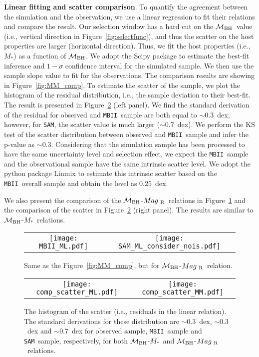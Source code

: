 \documentclass{natureprintstyle}
\newcommand{\mbh}{$\mathcal M_{\rm BH}$}
\newcommand{\mr}{$Mag_{\rm ~R}$}
\newcommand{\mstar}{{$M_*$}}
\newcommand{\sam}{\texttt{SAM}}
\newcommand{\mbii}{\texttt{MBII}}
\begin{document}
\textbf{Linear fitting and scatter comparison}.  
To quantify the agreement between the simulation and the observation, we use a linear regression to fit their relations and compare the result. Our selection window has a hard cut on the \mbh\ value (i.e., vertical direction in Figure~\ref{fig:selectfunc}), and thus the scatter on the host properties are larger (horizontal direction). Thus, we fit the host properties (i.e., \mstar) as a function of \mbh. We adopt the {\sc Scipy} package to estimate the best-fit inference and $1-\sigma$ confidence interval for the simulated sample. We then use the sample slope value to fit for the observations. The comparison results are showing in Figure~\ref{fig:MM_comp}. To estimate the scatter of the sample, we plot the histogram of the residual distribution, i.e., the sample deviation to their best-fit. The result is presented in Figure~\ref{fig:offset_comp} (left panel). We find the standard derivation of the residual for observed and \mbii\ sample are both equal to $\sim0.3$~dex; however, for \sam, the scatter value is much larger ($\sim0.7$~dex).  We perform the KS test of the scatter distribution between observed and \mbii\ sample and infer the p-value as $\sim0.3$. Considering that the simulation sample has been processed to have the same uncertainty level and selection effect, we expect the \mbii\ sample and the observational sample have the same intrinsic scatter level. We adopt the python package {\sc Linmix} to estimate this intrinsic scatter based on the \mbii\ overall sample and obtain the level as $0.25$~dex.

We also present the comparison of the \mbh-\mr\ relations in Figure~\ref{fig:ML_comp} and the comparison of the scatter in Figure~\ref{fig:offset_comp} (right panel). The results are similar to \mbh-\mstar\ relations.

\begin{figure*}[t]%
\begin{tabular}{c c}
\texttt{[image: MBII\_ML.pdf]} &
\texttt{[image: SAM\_ML\_consider\_nois.pdf]} \\
\end{tabular}
\caption{Same as the Figure~\ref{fig:MM_comp}, but for \mbh-\mr\ relation.}
\label{fig:ML_comp}
\end{figure*}


\begin{figure*}[t]%
\begin{tabular}{c c}
\texttt{[image: comp\_scatter\_ML.pdf]} &
\texttt{[image: comp\_scatter\_MM.pdf]} \\
\end{tabular}
\caption{The histogram of the scatter (i.e., residuals in the linear relation). The standard derivations for these distribution are $\sim0.3$~dex, $\sim0.3$~dex and $\sim0.7$~dex for observed sample, \mbii\ sample and \sam\ sample, respectively, for both \mbh-\mstar\ and \mbh-\mr\ relations.
}
\label{fig:offset_comp}
\end{figure*}
\end{document}
